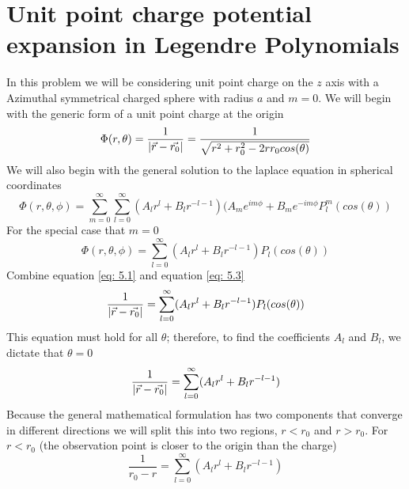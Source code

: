 \documentclass[12pt]{article}
\begin{document}
\section{Unit point charge potential expansion in Legendre Polynomials} \label{problem4}
    In this problem we will be considering unit point charge on the $z$ axis with a Azimuthal symmetrical charged sphere with radius $a$ and $m=0$.
    We will begin with the generic form of a unit point charge at the origin
    \begin{equation} \label{eq: 5.1}
        \Phi(r,\theta) = \frac{1}{\abs{\vec{r} - \vec{r_0}}} = \frac{1}{\sqrt{r^2 + r_0^2 - 2 r r_0 cos(\theta)}}
    \end{equation} 
    We will also begin with the general solution to the laplace equation in spherical coordinates
    \begin{equation} \label{5.2}
        \Phi(r,\theta, \phi) = \sum_{m=0}^{\infty}  \sum_{l=0}^{\infty} (A_l r^l + B_l r^{-l-1}) (A_m  e^{i m \phi} + B_m e^{-i m \phi} P_l^m (cos(\theta))
    \end{equation}
    For the special case that $m=0$
        \begin{equation} \label{eq: 5.3}
        \Phi(r,\theta, \phi) = \sum_{l=0}^{\infty} (A_l r^l + B_l r^{-l-1}) P_l (cos(\theta))
    \end{equation}
    Combine equation \ref{eq: 5.1} and equation \ref{eq: 5.3}
    \begin{equation} \label{eq: 5.4}
        \frac{1}{\abs{\vec{r} - \vec{r_0}}} = \sum_{l=0}^{\infty} (A_l r^l + B_l r^{-l-1}) P_l (cos(\theta))
    \end{equation}
    This equation must hold for all $\theta$; therefore, to find the coefficients $A_l$ and $B_l$, we dictate that $\theta=0$
    \begin{equation} \label{eq: 5.5}
        \frac{1}{\abs{\vec{r} - \vec{r_0}}} = \sum_{l=0}^{\infty} (A_l r^l + B_l r^{-l-1})
    \end{equation}
    Because the general mathematical formulation has two components that converge in different directions we will split this into two regions, $r<r_0$ and $r>r_0$.
    \newline For $r<r_0$ (the observation point is closer to the origin than the charge)
    \begin{equation} \label{eq: 5.6}
        \frac{1}{r_0 - r} = \sum_{l=0}^{\infty} (A_l r^l + B_l r^{-l-1})
    \end{equation}
\end{document}
